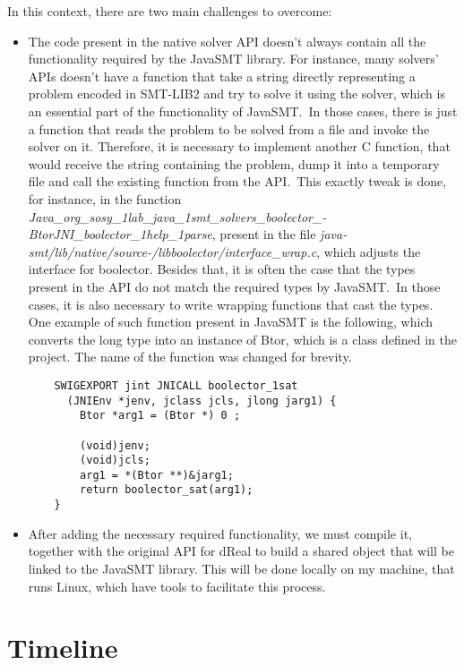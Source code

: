 \documentclass[a4paper,12pt]{article}
\begin{document}
In this context, there are two main challenges to overcome:
\begin{itemize}
  \item The code present in the native solver API doesn't always contain all the functionality required by the JavaSMT library. For instance, many solvers' APIs doesn't have a function that take a string directly representing a problem encoded in SMT-LIB2 and try to solve it using the solver, which is an essential part of the functionality of JavaSMT.\ In those cases, there is just a function that reads the problem to be solved from a file and invoke the solver on it. Therefore, it is necessary to implement another C function, that would receive the string containing the problem, dump it into a temporary file and call the existing function from the API.\ This exactly tweak is done, for instance, in the function \textit{Java\_org\_sosy\_1lab\_java\_1smt\_solvers\_boolector\_-BtorJNI\_boolector\_1help\_1parse}, present in the file \textit{java-smt/lib/native/source-/libboolector/interface\_wrap.c}, which adjusts the interface for boolector. Besides that, it is often the case that the types present in the API do not match the required types by JavaSMT.\ In those cases, it is also necessary to write wrapping functions that cast the types. One example of such function present in JavaSMT is the following, which converts the long type into an instance of Btor, which is a class defined in the project. The name of the function was changed for brevity.
    \begin{verbatim}
    SWIGEXPORT jint JNICALL boolector_1sat
      (JNIEnv *jenv, jclass jcls, jlong jarg1) {
        Btor *arg1 = (Btor *) 0 ;

        (void)jenv;
        (void)jcls;
        arg1 = *(Btor **)&jarg1;
        return boolector_sat(arg1);
    }
    \end{verbatim}
  \item After adding the necessary required functionality, we must compile it, together with the original API for dReal to build a shared object that will be linked to the JavaSMT library. This will be done locally on my machine, that runs Linux, which have tools to facilitate this process.

\end{itemize}


\section{Timeline}
\end{document}
